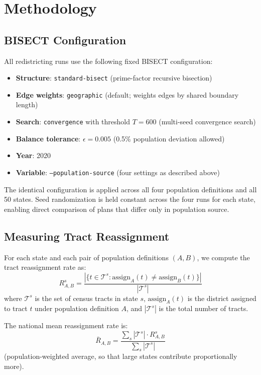 \section{Methodology}
\label{sec:methodology}

\subsection{BISECT Configuration}

All redistricting runs use the following fixed BISECT configuration:
\begin{itemize}
    \item \textbf{Structure}: \texttt{standard-bisect} (prime-factor recursive bisection)
    \item \textbf{Edge weights}: \texttt{geographic} (default; weights edges by shared boundary length)
    \item \textbf{Search}: \texttt{convergence} with threshold $T = 600$ (multi-seed convergence search)
    \item \textbf{Balance tolerance}: $\epsilon = 0.005$ (0.5\% population deviation allowed)
    \item \textbf{Year}: 2020
    \item \textbf{Variable}: \texttt{--population-source} (four settings as described above)
\end{itemize}

The identical configuration is applied across all four population definitions and all 50 states. Seed randomization is held constant across the four runs for each state, enabling direct comparison of plans that differ only in population source.

\subsection{Measuring Tract Reassignment}

For each state and each pair of population definitions $(A, B)$, we compute the tract reassignment rate as:
\[
R_{A,B}^s = \frac{\left| \{t \in \mathcal{T}^s : \text{assign}_A(t) \neq \text{assign}_B(t)\} \right|}{|\mathcal{T}^s|}
\]
where $\mathcal{T}^s$ is the set of census tracts in state $s$, $\text{assign}_A(t)$ is the district assigned to tract $t$ under population definition $A$, and $|\mathcal{T}^s|$ is the total number of tracts.

The national mean reassignment rate is:
\[
\bar{R}_{A,B} = \frac{\sum_s |\mathcal{T}^s| \cdot R_{A,B}^s}{\sum_s |\mathcal{T}^s|}
\]
(population-weighted average, so that large states contribute proportionally more).

